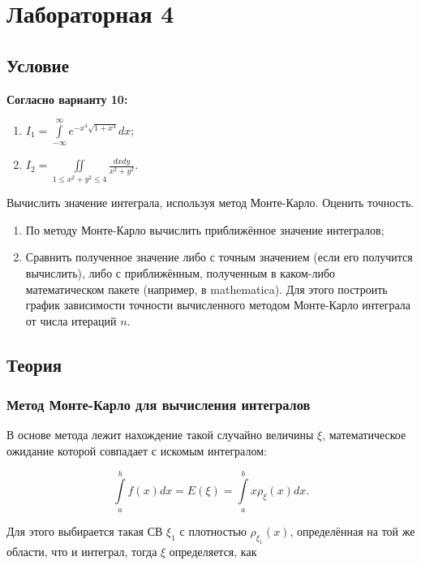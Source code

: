 \section{Лабораторная 4}

\subsection{Условие}

\textbf{Согласно варианту 10:}
\begin{enumerate}
	\item $I_{1} = \int\limits_{-\infty}^{\infty} e^{-x^{4} \sqrt{1+x^{4}}} dx$;
	\item $I_{2} = \iint\limits_{1 \leqslant x^{2} + y^{2} \leqslant 4} \frac{dxdy}{x^{2} + y^{2}}$.
\end{enumerate}

Вычислить значение интеграла, используя метод Монте-Карло. Оценить точность.

\begin{enumerate}
	\item По методу Монте-Карло вычислить приближённое значение интегралов;
	\item Сравнить полученное значение либо с точным значением (если его получится вычислить), либо с приближённым, полученным в каком-либо математическом пакете (например, в mathematica). Для этого построить график зависимости точности вычисленного методом Монте-Карло интеграла от числа итераций $n$.
\end{enumerate}

\subsection{Теория}
\subsubsection{Метод Монте-Карло для вычисления интегралов}

В основе метода лежит нахождение такой случайно величины $\xi$, математическое ожидание которой совпадает с искомым интегралом:

\begin{equation}
	\int\limits_{a}^{b}f(x)dx = E(\xi) = \int\limits_{a}^{b}x\rho_{\xi}(x)dx.
\end{equation}

Для этого выбирается такая СВ $\xi_{1}$ с плотностью $\rho_{\xi_{1}}(x)$, определённая на той же области, что и интеграл, тогда $\xi$ определяется, как

